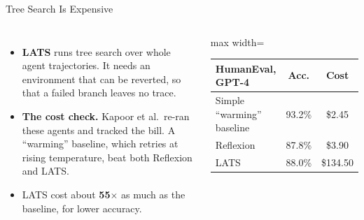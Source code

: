 \begin{frame}{Tree Search Is Expensive}
    \begin{columns}[T,onlytextwidth]
        \begin{itemize}\itemsep0.5em
            \item \textbf{LATS} runs tree search over whole agent trajectories. It needs an environment that can be \alert{reverted}, so that a failed branch leaves no trace.
            \item \textbf{The cost check.} Kapoor et al.\ re-ran these agents and tracked the bill. A ``warming'' baseline, which retries at rising temperature, beat both Reflexion and LATS.
            \item LATS cost about \textbf{55$\times$} as much as the baseline, for lower accuracy.
        \end{itemize}
        \centering
        \small
        \begin{adjustbox}{max width=\linewidth}\begin{tabular}{lcc}
            \toprule
            \textbf{HumanEval, GPT-4} & \textbf{Acc.} & \textbf{Cost} \\
            \midrule
            \rowcolor{KAUSTcyan!12} Simple ``warming'' baseline & 93.2\% & \$2.45 \\
            Reflexion & 87.8\% & \$3.90 \\
            LATS & 88.0\% & \alert{\$134.50} \\
            \bottomrule
        \end{tabular}\end{adjustbox}
    \end{columns}
    \vspace{0.6em}
\end{frame}

